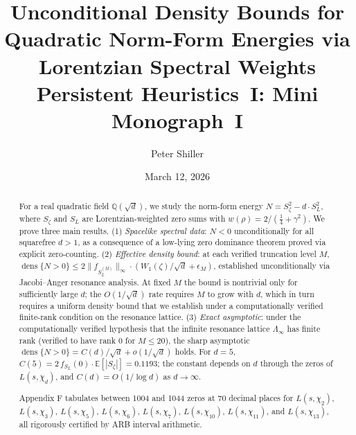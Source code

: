 \documentclass[12pt,reqno]{amsart}
\title[Persistent Heuristics I]{Unconditional Density Bounds for Quadratic Norm-Form Energies via Lorentzian Spectral Weights\\[0.5em]
\textnormal{\large Persistent Heuristics~I: Mini Monograph~I}}
\author{Peter Shiller}
\date{March 12, 2026}
\theoremstyle{plain}
\theoremstyle{definition}
\theoremstyle{remark}
\DeclareMathOperator{\dens}{dens}
\newcommand{\Q}{\mathbb{Q}}
\newcommand{\E}{\mathbb{E}}
\newcommand{\quarter}{\tfrac{1}{4}}
\begin{document}
\raggedbottom

\pagestyle{fancy}
\fancyhf{}                          %
\fancyhead[CE]{\leftmark}           %
\fancyhead[CO]{\rightmark}          %
\fancyfoot[C]{\thepage}             %
\renewcommand{\headrulewidth}{0pt}  %
\renewcommand{\footrulewidth}{0pt}
\fancypagestyle{plain}{%
  \fancyhf{}%
  \fancyfoot[C]{\thepage}%
  \fancyfoot[R]{%
    \ifnum\value{page}>3
      {\scriptsize\hyperref[toc]{[\,Back to Table of Contents\,]}}%
    \fi}%
  \renewcommand{\headrulewidth}{0pt}%
  \renewcommand{\footrulewidth}{0pt}%
}

\begin{abstract}
For a real quadratic field $\Q(\sqrt{d})$, we study the norm-form energy
$N = S_\zeta^2 - d \cdot S_L^2$, where $S_\zeta$ and $S_L$ are Lorentzian-weighted
zero sums with $w(\rho) = 2/(\quarter + \gamma^2)$.
We prove three main results.
(1) \emph{Spacelike spectral data}: $N < 0$ unconditionally for all squarefree $d > 1$, as a consequence of a low-lying zero dominance theorem proved via explicit zero-counting.
(2) \emph{Effective density bound}: at each verified truncation level $M$,
$\dens\{N > 0\} \leq 2\|f_{S_L^{(M)}}\|_\infty \cdot (W_1(\zeta)/\sqrt{d} + \epsilon_M)$,
established unconditionally via Jacobi--Anger resonance analysis.
At fixed $M$ the bound is nontrivial only for sufficiently large $d$; the $O(1/\sqrt{d})$ rate requires $M$ to grow with $d$, which in turn requires a uniform density bound that we establish under a computationally verified finite-rank condition on the resonance lattice.
(3) \emph{Exact asymptotic}: under the computationally verified hypothesis that the
infinite resonance lattice $\Lambda_\infty$ has finite rank (verified to have
rank $0$ for $M \leq 20$), the sharp asymptotic
$\dens\{N > 0\} = C(d)/\sqrt{d} + o(1/\sqrt{d})$ holds.  For $d = 5$,
$C(5) = 2\,f_{S_L}(0)\cdot\E[|S_\zeta|] = 0.1193$; the constant depends on $d$
through the zeros of $L(s,\chi_d)$, and $C(d) = O(1/\log d)$ as $d \to \infty$.

\medskip

Appendix F tabulates between 1004 and 1044 zeros at 70 decimal places for $L(s,\chi_2)$, $L(s,\chi_3)$, $L(s,\chi_5)$, $L(s,\chi_6)$, $L(s,\chi_7)$, $L(s,\chi_{10})$, $L(s,\chi_{11})$, and $L(s,\chi_{13})$, all rigorously certified by ARB interval arithmetic.
\end{abstract}
\end{document}
